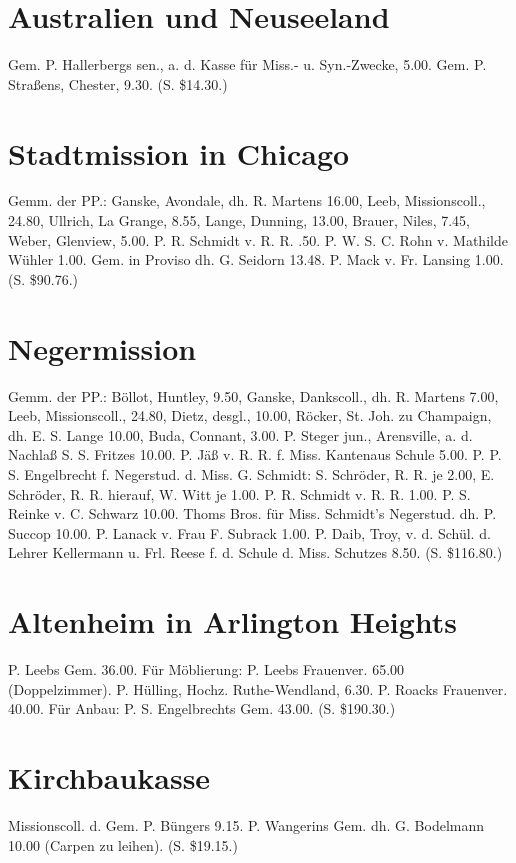 \section{Australien und Neuseeland}
Gem. P. Hallerbergs sen., a. d. Kasse für Miss.- u. Syn.-Zwecke, 5.00. Gem. P. Straßens, Chester, 9.30. (S. \$14.30.)

\section{Stadtmission in Chicago}
Gemm. der PP.: Ganske, Avondale, dh. R. Martens 16.00, Leeb, Missionscoll., 24.80, Ullrich, La Grange, 8.55, Lange, Dunning, 13.00, Brauer, Niles, 7.45, Weber, Glenview, 5.00. P. R. Schmidt v. R. R. .50. P. W. S. C. Rohn v. Mathilde Wühler 1.00. Gem. in Proviso dh. G. Seidorn 13.48. P. Mack v. Fr. Lansing 1.00. (S. \$90.76.)

\section{Negermission}
Gemm. der PP.: Böllot, Huntley, 9.50, Ganske, Dankscoll., dh. R. Martens 7.00, Leeb, Missionscoll., 24.80, Dietz, desgl., 10.00, Röcker, St. Joh. zu Champaign, dh. E. S. Lange 10.00, Buda, Connant, 3.00. P. Steger jun., Arensville, a. d. Nachlaß S. S. Fritzes 10.00. P. Jäß v. R. R. f. Miss. Kantenaus Schule 5.00. P. P. S. Engelbrecht f. Negerstud. d. Miss. G. Schmidt: S. Schröder, R. R. je 2.00, E. Schröder, R. R. hierauf, W. Witt je 1.00. P. R. Schmidt v. R. R. 1.00. P. S. Reinke v. C. Schwarz 10.00. Thoms Bros. für Miss. Schmidt’s Negerstud. dh. P. Succop 10.00. P. Lanack v. Frau F. Subrack 1.00. P. Daib, Troy, v. d. Schül. d. Lehrer Kellermann u. Frl. Reese f. d. Schule d. Miss. Schutzes 8.50. (S. \$116.80.)

\section{Altenheim in Arlington Heights}
P. Leebs Gem. 36.00. Für Möblierung: P. Leebs Frauenver. 65.00 (Doppelzimmer). P. Hülling, Hochz. Ruthe-Wendland, 6.30. P. Roacks Frauenver. 40.00. Für Anbau: P. S. Engelbrechts Gem. 43.00. (S. \$190.30.)

\section{Kirchbaukasse}
Missionscoll. d. Gem. P. Büngers 9.15. P. Wangerins Gem. dh. G. Bodelmann 10.00 (Carpen zu leihen). (S. \$19.15.)

